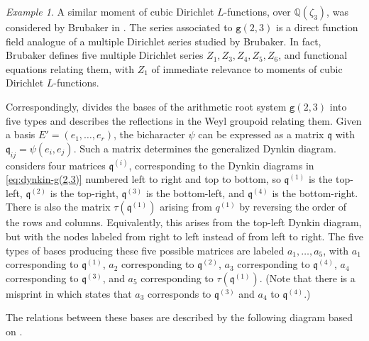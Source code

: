 \documentclass[11pt,letterpaper]{article}
\theoremstyle{definition}
\theoremstyle{remark}
\newtheorem{example}[theorem]{Example}
\numberwithin{equation}{section}
\theoremstyle{dotless}
\newcommand{\hchi}{\psi} %
\begin{document}
\begin{example}
A similar moment of cubic Dirichlet $L$-functions, over $\mathbb Q(\zeta_3)$, was considered by Brubaker in \cite{BrubakerThesis}. The series associated to $\mathtt{g}(2,3)$ is a direct function field analogue of a multiple Dirichlet series studied by Brubaker. In fact, Brubaker defines five  multiple Dirichlet series $Z_1,Z_3, Z_4, Z_5, Z_6$, and functional equations relating them, with $Z_1$ of immediate relevance to moments of cubic Dirichlet $L$-functions.

Correspondingly, \cite[\S8.3]{AndruskiewitschAngiono} divides the bases of the arithmetic root system $\mathtt{g}(2,3)$ into five types and describes the reflections in the Weyl groupoid relating them. Given a basis $E'=(e_1,\dots,e_r)$, the bicharacter $\hchi$ can be expressed as a matrix $\mathfrak q$ with $\mathfrak q_{ij} = \hchi(e_i,e_j)$. Such a matrix determines the generalized Dynkin diagram. \cite[\S8.3.3]{AndruskiewitschAngiono} considers four matrices $\mathfrak q^{(i)}$, corresponding to the Dynkin diagrams in \eqref{eq:dynkin-g(2,3)} numbered left to right and top to bottom, so $\mathfrak q^{(1)}$ is the top-left, $\mathfrak q^{(2)}$ is the top-right, $\mathfrak q^{(3)}$ is the bottom-left, and $\mathfrak q^{(4)}$ is the bottom-right.  There is also the matrix $\tau( \mathfrak q^{(1)})$ arising from $q^{(1)}$ by reversing the order of the rows and columns. Equivalently, this arises from the top-left Dynkin diagram, but with the nodes labeled from right to left instead of from left to right. The five types of bases producing these five possible matrices are labeled $a_1,\ldots, a_5$, with $a_1$ corresponding to $\mathfrak q^{(1)}$, $a_2$ corresponding to $\mathfrak q^{(2)}$, $a_3$ corresponding to $\mathfrak q^{(4)}$, $a_4$ corresponding to $\mathfrak q^{(3)}$, and $a_5$ corresponding to $\tau(\mathfrak q^{(1)})$. (Note that there is a misprint in \cite[\S8.3.3]{AndruskiewitschAngiono} which states that $a_3$ corresponds to $\mathfrak q^{(3)}$ and $a_4$ to $\mathfrak q^{(4)}$.)

The relations between these bases are described by the following diagram based on \cite[\S8.3.1]{AndruskiewitschAngiono}.


\end{example}
\end{document}
